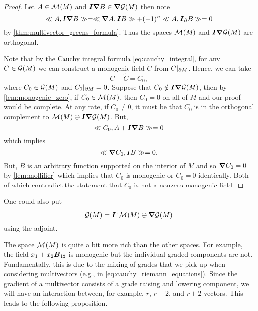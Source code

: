 \begin{proof}
Let $A \in \mathcal{M}^{}(M)$ and $\boldsymbol{I}\boldsymbol{\nabla} B\in \boldsymbol{\nabla} \mathcal{G}(M)$ then note
\begin{equation}
\ll A, \boldsymbol{I} \boldsymbol{\nabla} B\gg = \ll \boldsymbol{\nabla} A, \boldsymbol{I} B\gg + (-1)^{n} \ll A, \boldsymbol{I}_\partial B\gg = 0
\end{equation}
by \cref{thm:multivector_greens_formula}. Thus the spaces $\mathcal{M}^{}(M)$ and $\boldsymbol{I}\boldsymbol{\nabla} \mathcal{G}(M)$ are orthogonal. 

Note that by the Cauchy integral formula \cref{eq:cauchy_integral}, for any $C \in \mathcal{G}(M)$ we can construct a monogenic field $\tilde{C}$ from $C\vert_{\partial M}$. Hence, we can take
\begin{equation}
C - \tilde{C} = C_0,
\end{equation}
where $C_0\in \mathcal{G}(M)$ and $C_0\vert_{\partial M} =0$. Suppose that $C_0 \notin \boldsymbol{I} \boldsymbol{\nabla} \mathcal{G}(M)$, then by \cref{lem:monogenic_zero}, if $C_0 \in \mathcal{M}^{}(M)$, then $C_0=0$ on all of $M$ and our proof would be complete. At any rate, if $C_0\neq 0$, it must be that $C_0$ is in the orthogonal complement to $\mathcal{M}^{}(M)\oplus \boldsymbol{I}\boldsymbol{\nabla} \mathcal{G}(M)$. But,
\begin{equation}
\ll C_0, A+\boldsymbol{I}\boldsymbol{\nabla} B\gg = 0
\end{equation}
which implies
\begin{equation}
\ll \boldsymbol{\nabla} C_0, \boldsymbol{I} B\gg = 0.
\end{equation}
But, $B$ is an arbitrary function supported on the interior of $M$ and so $\boldsymbol{\nabla} C_0 =0$ by \cref{lem:mollifier} which implies that $C_0$ is monogenic or $C_0=0$ identically. Both of which contradict the statement that $C_0$ is not a nonzero monogenic field. 
\end{proof}
\begin{remark}
One could also put
\begin{equation}
\mathcal{G}(M) = \boldsymbol{I}^{\dagger} \mathcal{M}^{}(M) \oplus \boldsymbol{\nabla} \mathcal{G}(M)
\end{equation}
using the adjoint.
\end{remark}

The space $\mathcal{M}^{}(M)$ is quite a bit more rich than the other spaces.  For example, the field $x_1+x_2 \boldsymbol{B}_{12}$ is monogenic but the individual graded components are not. Fundamentally, this is due to the mixing of grades that we pick up when considering multivectors (e.g., in \cref{eq:cauchy_riemann_equations}). Since the gradient of a multivector consists of a grade raising and lowering component, we will have an interaction between, for example, $r$, $r-2$, and $r+2$-vectors. This leads to the following proposition.

